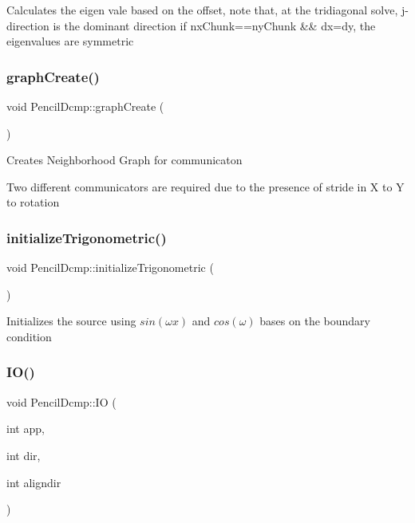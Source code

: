 Calculates the eigen vale based on the offset, note that, at the tridiagonal solve, j-\/ direction is the dominant direction if nx\+Chunk==ny\+Chunk \&\& dx=dy, the eigenvalues are symmetric \mbox{\label{classPencilDcmp_a6ba4438fd05274b40dd2e56aeba339e1}} 
\subsubsection{\texorpdfstring{graph\+Create()}{graphCreate()}}
{\footnotesize\ttfamily void Pencil\+Dcmp\+::graph\+Create (\begin{DoxyParamCaption}{ }\end{DoxyParamCaption})}

Creates Neighborhood Graph for communicaton

Two different communicators are required due to the presence of stride in X to Y to rotation \mbox{\label{classPencilDcmp_a58ebcd5b4bf661379cfc89df94f1d1eb}} 
\subsubsection{\texorpdfstring{initialize\+Trigonometric()}{initializeTrigonometric()}}
{\footnotesize\ttfamily void Pencil\+Dcmp\+::initialize\+Trigonometric (\begin{DoxyParamCaption}{ }\end{DoxyParamCaption})}

Initializes the source using $sin(\omega x)$ and $cos(\omega)$ bases on the boundary condition \mbox{\label{classPencilDcmp_aad302367ed6433ac0fab84c540b9ca49}} 
\subsubsection{\texorpdfstring{I\+O()}{IO()}}
{\footnotesize\ttfamily void Pencil\+Dcmp\+::\+IO (\begin{DoxyParamCaption}\item[{int}]{app,  }\item[{int}]{dir,  }\item[{int}]{aligndir }\end{DoxyParamCaption})}

